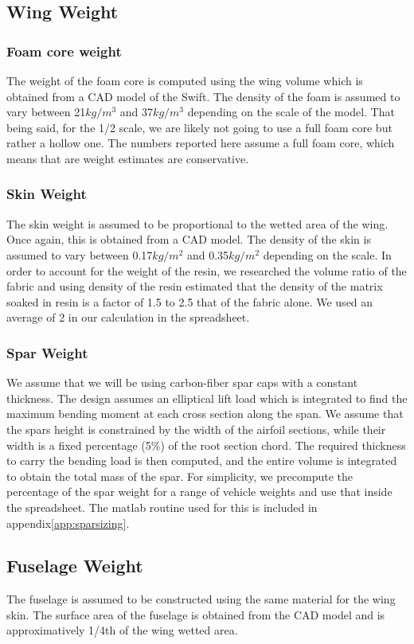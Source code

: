 \documentclass[titlepage,10pt]{article}
\begin{document}
\subsection{Wing Weight}
\subsubsection{Foam core weight}
The weight of the foam core is computed using the wing volume which is obtained from a CAD model of the Swift. The density of the foam is assumed to vary between 21$kg/m^3$ and 37$kg/m^3$ depending on the scale of the model. That being said, for the 1/2 scale, we are likely not going to use a full foam core but rather a hollow one. The numbers reported here assume a full foam core, which means that are weight estimates are conservative.

\subsubsection{Skin Weight}
The skin weight is assumed to be proportional to the wetted area of the wing. Once again, this is obtained from a CAD model. The density of the skin is assumed to vary between 0.17$kg/m^2$ and 0.35$kg/m^2$ depending on the scale. In order to account for the weight of the resin, we researched the volume ratio of the fabric and using density of the resin estimated that the density of the matrix soaked in resin is a factor of 1.5 to 2.5 that of the fabric alone. We used an average of 2 in our calculation in the spreadsheet.

\subsubsection{Spar Weight}
We assume that we will be using carbon-fiber spar caps with a constant thickness. The design assumes an elliptical lift load which is integrated to find the maximum bending moment at each cross section along the span. We assume that the spars height is constrained by the width of the airfoil sections, while their width is a fixed percentage (5\%) of the root section chord. The required thickness to carry the bending load is then computed, and the entire volume is integrated to obtain the total mass of the spar. For simplicity, we precompute the percentage of the spar weight for a range of vehicle weights and use that inside the spreadsheet. The matlab routine used for this is included in appendix\ref{app:sparsizing}. 

\subsection{Fuselage Weight}
The fuselage is assumed to be constructed using the same material for the wing skin. The surface area of the fuselage is obtained from the CAD model and is approximatively 1/4th of the wing wetted area.
\end{document}
